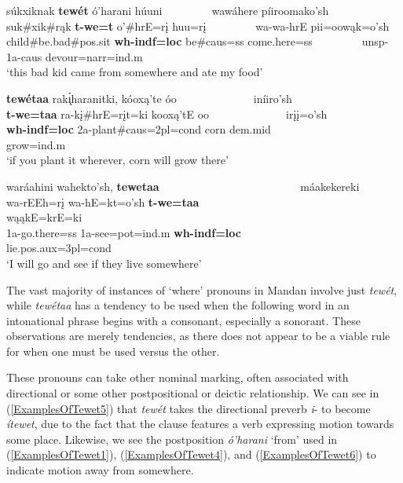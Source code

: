 \begin{exe}
\begin{xlist}
\item\label{ExamplesOfTewet6} \glll súkxiknak \textbf{tewét} ó'harani húuni ~ ~ ~ ~ ~ wawáhere píiroomako'sh\\
    suk\#xik\#rąk \textbf{t-we=t} o'\#hrE=rį huu=rį ~ ~ ~ ~ ~  wa-wa-hrE pii=oowąk=o'sh\\
    \textnormal{child}\#\textnormal{be.bad}\#pos.sit \textbf{wh-indf=loc} \textnormal{be}\#caus=ss \textnormal{come.here}=ss ~ ~ ~ ~ ~ unsp-1a-caus \textnormal{devour}=narr=ind.m\\
    \glt `this bad kid came from somewhere and ate my food' \citep[120]{hollow1973b}
    
\item\label{ExamplesOfTewet7} \glll \textbf{tewétaa} rak\'{ı̨}haranitki, kóoxą'te óo ~ ~ ~ ~ ~ ~ ~ ~   iníiro'sh\\
    \textbf{t-we=taa} ra-kį\#hrE=rįt=ki kooxą'tE oo ~ ~ ~ ~ ~ ~ ~ ~  irįį=o'sh\\
    \textbf{wh-indf=loc} 2a-\textnormal{plant}\#caus=2pl=cond \textnormal{corn} dem.mid ~ ~ ~ ~ ~ ~ ~ ~  \textnormal{grow}=ind.m\\
    \glt `if you plant it wherever, corn will grow there' \citep[293]{hollow1973b}
    
\item\label{ExamplesOfTewet8} \glll waráahini wahekto'sh, \textbf{tewetaa}  ~ ~ ~ ~ ~ ~ ~ ~ ~ ~ ~ ~ ~ ~ ~ máakekereki\\
    wa-rEEh=rį wa-hE=kt=o'sh \textbf{t-we=taa} ~ ~ ~ ~ ~ ~ ~ ~ ~ ~ ~ ~ ~ ~ ~  wąąkE=krE=ki\\
    1a-\textnormal{go.there}=ss 1a-\textnormal{see}=pot=ind.m \textbf{wh-indf=loc} ~ ~ ~ ~ ~ ~ ~ ~ ~ ~ ~ ~ ~ ~ ~  \textnormal{lie}.pos.aux=3pl=cond\\
    \glt `I will go and see if they live somewhere' \citep[25]{trechter2012}
    
\end{xlist}

\end{exe}

The vast majority of instances of `where' pronouns in Mandan involve just \textit{tewét}, while \textit{tewétaa} has a tendency to be used when the following word in an intonational phrase begins with a consonant, especially a sonorant. These observations are merely tendencies, as there does not appear to be a viable rule for when one must be used versus the other.

These pronouns can take other nominal marking, often associated with directional or some other postpositional or deictic relationship. We can see in (\ref{ExamplesOfTewet5}) that \textit{tewét} takes the directional preverb \textit{i}- to become \textit{ítewet}, due to the fact that the clause features a verb expressing motion towards some place. Likewise, we see the postposition \textit{ó'harani} `from' used in (\ref{ExamplesOfTewet1}), (\ref{ExamplesOfTewet4}), and (\ref{ExamplesOfTewet6}) to indicate motion away from somewhere. 

